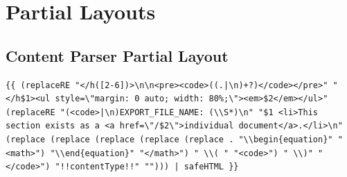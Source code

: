 \documentclass[11pt]{article}
\begin{document}
\section{Partial Layouts}
\label{sec:orge2f1778}
\subsection{Content Parser Partial Layout}
\label{sec:org39edfc7}
\begin{verbatim}
{{ (replaceRE "</h([2-6])>\n\n<pre><code>((.|\n)+?)</code></pre>" "</h$1><ul style=\"margin: 0 auto; width: 80%;\"><em>$2</em></ul>" (replaceRE "(<code>|\n)EXPORT_FILE_NAME: (\\S*)\n" "$1 <li>This section exists as a <a href=\"/$2\">individual document</a>.</li>\n" (replace (replace (replace (replace (replace . "\\begin{equation}" "<math>") "\\end{equation}" "</math>") " \\( " "<code>") " \\)" "</code>") "!!contentType!!" ""))) | safeHTML }}
\end{verbatim}
\end{document}
